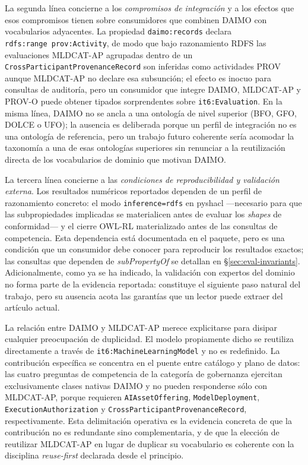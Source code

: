 \documentclass[11pt,a4paper]{article}
\newcommand{\code}[1]{\texttt{#1}}
\begin{document}
La segunda línea concierne a los \emph{compromisos de integración} y a los efectos que esos compromisos tienen sobre consumidores que combinen DAIMO con vocabularios adyacentes. La propiedad \code{daimo:records} declara \code{rdfs:range~prov:Activity}, de modo que bajo razonamiento RDFS las evaluaciones MLDCAT-AP agrupadas dentro de un \code{CrossParticipantProvenanceRecord} son inferidas como actividades PROV aunque MLDCAT-AP no declare esa subsunción; el efecto es inocuo para consultas de auditoría, pero un consumidor que integre DAIMO, MLDCAT-AP y PROV-O puede obtener tipados sorprendentes sobre \code{it6:Evaluation}. En la misma línea, DAIMO no se ancla a una ontología de nivel superior (BFO, GFO, DOLCE o UFO); la ausencia es deliberada porque un perfil de integración no es una ontología de referencia, pero un trabajo futuro coherente sería acomodar la taxonomía a una de esas ontologías superiores sin renunciar a la reutilización directa de los vocabularios de dominio que motivan DAIMO.

La tercera línea concierne a las \emph{condiciones de reproducibilidad y validación externa}. Los resultados numéricos reportados dependen de un perfil de razonamiento concreto: el modo \texttt{inference=rdfs} en pyshacl ---necesario para que las subpropiedades implicadas se materialicen antes de evaluar los \emph{shapes} de conformidad--- y el cierre OWL-RL materializado antes de las consultas de competencia. Esta dependencia está documentada en el paquete, pero es una condición que un consumidor debe conocer para reproducir los resultados exactos; las consultas que dependen de \emph{subPropertyOf} se detallan en §\ref{sec:eval-invariants}. Adicionalmente, como ya se ha indicado, la validación con expertos del dominio no forma parte de la evidencia reportada: constituye el siguiente paso natural del trabajo, pero su ausencia acota las garantías que un lector puede extraer del artículo actual.

La relación entre DAIMO y MLDCAT-AP merece explicitarse para disipar cualquier preocupación de duplicidad. El modelo propiamente dicho se reutiliza directamente a través de \code{it6:MachineLearningModel} y no es redefinido. La contribución específica se concentra en el puente entre catálogo y plano de datos: las cuatro preguntas de competencia de la categoría de gobernanza ejercitan exclusivamente clases nativas DAIMO y no pueden responderse sólo con MLDCAT-AP, porque requieren \code{AIAssetOffering}, \code{ModelDeployment}, \code{ExecutionAuthorization} y \code{CrossParticipantProvenanceRecord}, respectivamente. Esta delimitación operativa es la evidencia concreta de que la contribución no es redundante sino complementaria, y de que la elección de reutilizar MLDCAT-AP en lugar de duplicar su vocabulario es coherente con la disciplina \emph{reuse-first} declarada desde el principio.
\end{document}

